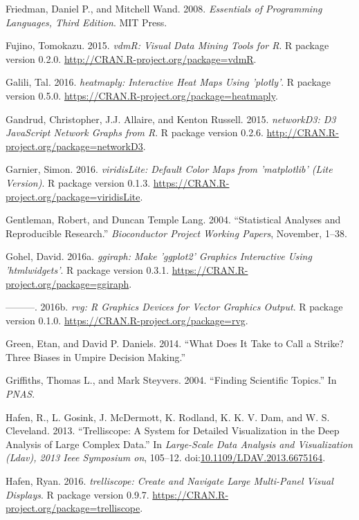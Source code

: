 \documentclass[12pt,]{isuthesis}
\begin{document}
\hypertarget{ref-eopl}{}
Friedman, Daniel P., and Mitchell Wand. 2008. \emph{Essentials of
Programming Languages, Third Edition}. MIT Press.

\hypertarget{ref-vdmR}{}
Fujino, Tomokazu. 2015. \emph{vdmR: Visual Data Mining Tools for R}. R
package version 0.2.0. \url{http://CRAN.R-project.org/package=vdmR}.

\hypertarget{ref-heatmaply}{}
Galili, Tal. 2016. \emph{heatmaply: Interactive Heat Maps Using
'plotly'}. R package version 0.5.0.
\url{https://CRAN.R-project.org/package=heatmaply}.

\hypertarget{ref-networkD3}{}
Gandrud, Christopher, J.J. Allaire, and Kenton Russell. 2015.
\emph{networkD3: D3 JavaScript Network Graphs from R}. R package version
0.2.6. \url{http://CRAN.R-project.org/package=networkD3}.

\hypertarget{ref-viridisLite}{}
Garnier, Simon. 2016. \emph{viridisLite: Default Color Maps from
'matplotlib' (Lite Version)}. R package version 0.1.3.
\url{https://CRAN.R-project.org/package=viridisLite}.

\hypertarget{ref-Gentleman:Lang}{}
Gentleman, Robert, and Duncan Temple Lang. 2004. ``Statistical Analyses
and Reproducible Research.'' \emph{Bioconductor Project Working Papers},
November, 1--38.

\hypertarget{ref-ggiraph}{}
Gohel, David. 2016a. \emph{ggiraph: Make 'ggplot2' Graphics Interactive
Using 'htmlwidgets'}. R package version 0.3.1.
\url{https://CRAN.R-project.org/package=ggiraph}.

\hypertarget{ref-rvg}{}
---------. 2016b. \emph{rvg: R Graphics Devices for Vector Graphics
Output}. R package version 0.1.0.
\url{https://CRAN.R-project.org/package=rvg}.

\hypertarget{ref-bias}{}
Green, Etan, and David P. Daniels. 2014. ``What Does It Take to Call a
Strike? Three Biases in Umpire Decision Making.''

\hypertarget{ref-Griffiths}{}
Griffiths, Thomas L., and Mark Steyvers. 2004. ``Finding Scientific
Topics.'' In \emph{PNAS}.

\hypertarget{ref-trelliscope}{}
Hafen, R., L. Gosink, J. McDermott, K. Rodland, K. K. V. Dam, and W. S.
Cleveland. 2013. ``Trelliscope: A System for Detailed Visualization in
the Deep Analysis of Large Complex Data.'' In \emph{Large-Scale Data
Analysis and Visualization (Ldav), 2013 Ieee Symposium on}, 105--12.
doi:\href{https://doi.org/10.1109/LDAV.2013.6675164}{10.1109/LDAV.2013.6675164}.

\hypertarget{ref-trelliscope-pkg}{}
Hafen, Ryan. 2016. \emph{trelliscope: Create and Navigate Large
Multi-Panel Visual Displays}. R package version 0.9.7.
\url{https://CRAN.R-project.org/package=trelliscope}.
\end{document}

